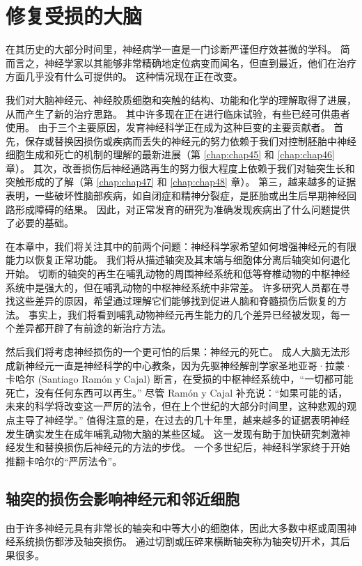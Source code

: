 \chapter{修复受损的大脑} \label{chap:chap50}

在其历史的大部分时间里，神经病学一直是一门诊断严谨但疗效甚微的学科。 简而言之，神经学家以其能够非常精确地定位病变而闻名，但直到最近，他们在治疗方面几乎没有什么可提供的。 这种情况现在正在改变。

我们对大脑神经元、神经胶质细胞和突触的结构、功能和化学的理解取得了进展，从而产生了新的治疗思路。 其中许多现在正在进行临床试验，有些已经可供患者使用。 由于三个主要原因，发育神经科学正在成为这种巨变的主要贡献者。 首先，保存或替换因损伤或疾病而丢失的神经元的努力依赖于我们对控制胚胎中神经细胞生成和死亡的机制的理解的最新进展（第 \ref{chap:chap45} 和 \ref{chap:chap46} 章）。 其次，改善损伤后神经通路再生的努力很大程度上依赖于我们对轴突生长和突触形成的了解（第 \ref{chap:chap47} 和 \ref{chap:chap48} 章）。 第三，越来越多的证据表明，一些破坏性脑部疾病，如自闭症和精神分裂症，是胚胎或出生后早期神经回路形成障碍的结果。 因此，对正常发育的研究为准确发现疾病出了什么问题提供了必要的基础。

在本章中，我们将关注其中的前两个问题：神经科学家希望如何增强神经元的有限能力以恢复正常功能。 我们将从描述轴突及其末端与细胞体分离后轴突如何退化开始。 切断的轴突的再生在哺乳动物的周围神经系统和低等脊椎动物的中枢神经系统中是强大的，但在哺乳动物的中枢神经系统中非常差。 许多研究人员都在寻找这些差异的原因，希望通过理解它们能够找到促进人脑和脊髓损伤后恢复的方法。 事实上，我们将看到哺乳动物神经元再生能力的几个差异已经被发现，每一个差异都开辟了有前途的新治疗方法。

然后我们将考虑神经损伤的一个更可怕的后果：神经元的死亡。 成人大脑无法形成新神经元一直是神经科学的中心教条，因为先驱神经解剖学家圣地亚哥·拉蒙·卡哈尔 (Santiago Ramón y Cajal) 断言，在受损的中枢神经系统中，“一切都可能死亡，没有任何东西可以再生。” 尽管 Ramón y Cajal 补充说：“如果可能的话，未来的科学将改变这一严厉的法令，但在上个世纪的大部分时间里，这种悲观的观点主导了神经学。” 值得注意的是，在过去的几十年里，越来越多的证据表明神经发生确实发生在成年哺乳动物大脑的某些区域。 这一发现有助于加快研究刺激神经发生和替换损伤后神经元的方法的步伐。 一个多世纪后，神经科学家终于开始推翻卡哈尔的“严厉法令”。


\section{轴突的损伤会影响神经元和邻近细胞}
由于许多神经元具有非常长的轴突和中等大小的细胞体，因此大多数中枢或周围神经系统损伤都涉及轴突损伤。 通过切割或压碎来横断轴突称为轴突切开术，其后果很多。




